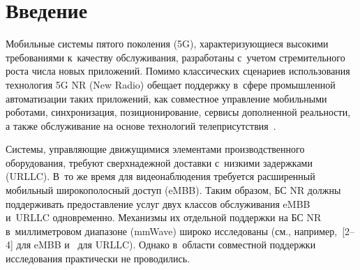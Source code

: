 
  



\thispagestyle{headings}

\begin{multicols}{2}

\label{st\stat}

    
\section{Введение}

Мобильные системы пятого поколения (5G), характеризующиеся высокими 
требованиями к~качеству обслуживания, разработаны с~учетом стремительного роста 
числа новых приложений. Помимо классических сценариев использования технология 
5G NR (New Radio) обещает поддержку в~сфере промышленной автоматизации таких 
приложений, как совместное управление мобильными роботами, синхронизация, 
позиционирование, сервисы дополненной реальности, а также обслуживание на основе 
технологий телеприсутствия~\cite{ghosh2019industrial}.

Системы, управляющие движущимися элементами производственного оборудования, 
требуют сверхнадежной доставки с~низкими задержками (URLLC). В~то же время для видеонаблюдения требуется расширенный 
мобильный широкополосный доступ (eMBB). Таким 
образом, БС NR должны поддерживать предоставление услуг двух 
классов обслуживания eMBB и~URLLC одновременно. Механизмы их отдельной поддержки 
на БС NR в~миллиметровом диапазоне (mmWave) широко исследованы 
(см., например,~[2--4] для eMBB и~\cite{rao2018packet, mahmood2019resource} для 
URLLC). Однако в~об\-ласти совместной поддержки исследования практически не 
проводились.

\begin{figure*} %
 \vspace*{1pt}
\begin{center}
   \mbox{%
\epsfxsize=160.748mm 
}
\end{center}
\vspace*{-3pt}
\label{fig:deployment}
\vspace*{9pt}
\end{figure*}


\end{multicols}

